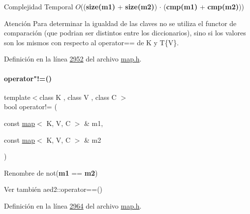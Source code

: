 \begin{DoxyDescription}
\item[Complejidad Temporal]$O$(({\bfseries size(m1)} + {\bfseries size(m2)}) $\cdot$ ({\bfseries cmp(m1)} + {\bfseries cmp(m2)}))
\end{DoxyDescription}

\begin{DoxyAttention}{Atención}
Para determinar la igualdad de las claves no se utiliza el functor de comparación (que podrian ser distintos entre los diccionarios), sino si los valores son los mismos con respecto al operator== de K y T\{V\}. 
\end{DoxyAttention}


Definición en la línea \hyperlink{map_8h_source_l02952}{2952} del archivo \hyperlink{map_8h_source}{map.\+h}.

\mbox{\label{classaed2_1_1map_abce0fa35c5b25fd67111c2e704616f09_abce0fa35c5b25fd67111c2e704616f09}} 
\paragraph{\texorpdfstring{operator"!=()}{operator!=()}}
{\footnotesize\ttfamily template$<$class K , class V , class C $>$ \\
bool operator!= (\begin{DoxyParamCaption}\item[{const \hyperlink{classaed2_1_1map}{map}$<$ K, V, C $>$ \&}]{m1,  }\item[{const \hyperlink{classaed2_1_1map}{map}$<$ K, V, C $>$ \&}]{m2 }\end{DoxyParamCaption})\hspace{0.3cm}{\ttfamily [related]}}



Renombre de not({\bfseries m1} == {\bfseries m2}) 

\begin{DoxySeeAlso}{Ver también}
aed2\+::operator==() 
\end{DoxySeeAlso}


Definición en la línea \hyperlink{map_8h_source_l02964}{2964} del archivo \hyperlink{map_8h_source}{map.\+h}.

\mbox{\label{classaed2_1_1map_a8ff07f6a24c290ea7e8f63ec7ab24f8d_a8ff07f6a24c290ea7e8f63ec7ab24f8d}} 
